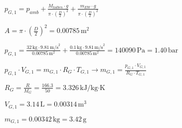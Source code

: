 \( p_{G,1} = p_{amb} + \frac{M_{kolben} \cdot g}{\pi \cdot (\frac{D}{2})^2} + \frac{m_{EW} \cdot g}{\pi \cdot (\frac{D}{2})^2} \)  

\( A = \pi \cdot (\frac{D}{2})^2 = 0.00785 \, \text{m}^2 \)  

\( p_{G,1} = \frac{32 \, \text{kg} \cdot 9.81 \, \text{m/s}^2}{0.00785 \, \text{m}^2} + \frac{0.1 \, \text{kg} \cdot 9.81 \, \text{m/s}^2}{0.00785 \, \text{m}^2} = 140090 \, \text{Pa} = 1.40 \, \text{bar} \)  

\( p_{G,1} \cdot V_{G,1} = m_{G,1} \cdot R_G \cdot T_{G,1} \rightarrow m_{G,1} = \frac{p_{G,1} \cdot V_{G,1}}{R_G \cdot T_{G,1}} \)  

\( R_G = \frac{R}{M_G} = \frac{166.3}{50} = 3.326 \, \text{kJ/kg·K} \)  

\( V_{G,1} = 3.14 \, \text{L} = 0.00314 \, \text{m}^3 \)  

\( m_{G,1} = 0.00342 \, \text{kg} = 3.42 \, \text{g} \)